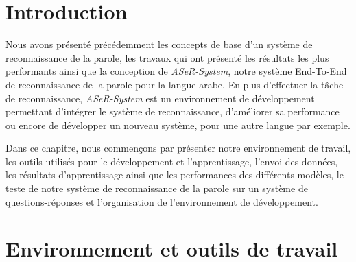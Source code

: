 \section{Introduction}
Nous avons présenté précédemment les concepts de base d'un système de reconnaissance de la parole, les travaux qui ont présenté les résultats les plus performants ainsi que la conception de \textit{ASeR-System}, notre système End-To-End de reconnaissance de la parole pour la langue arabe. En plus d'effectuer la tâche de reconnaissance, \textit{ASeR-System} est un environnement de développement permettant d'intégrer le système de reconnaissance, d'améliorer sa performance ou encore de développer un nouveau système, pour une autre langue par exemple.

Dans ce chapitre, nous commençons par présenter notre environnement de travail, les outils utilisés pour le développement et l'apprentissage, l'envoi des données, les résultats d'apprentissage ainsi que les performances des différents modèles, le teste de notre système de reconnaissance de la parole sur un système de questions-réponses et l'organisation de l'environnement de développement. 

\section{Environnement et outils de travail}
